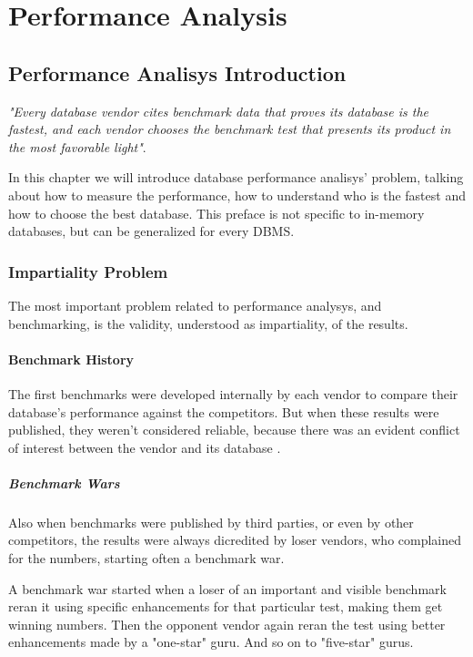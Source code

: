 \part{Performance Analysis}

\chapter{Performance Analisys Introduction}
\emph{"Every database vendor cites benchmark data that proves its database is the fastest, and each vendor chooses the benchmark test that presents its product in the most favorable light"}\cite{burleson}.

In this chapter we will introduce database performance analisys' problem, talking about how to measure the performance, how to understand who is the fastest and how to choose the best database. This preface is not specific to in-memory databases, but can be generalized for every DBMS.
	
	\section{Impartiality Problem}
The most important problem related to performance analysys, and benchmarking, is the validity, understood as impartiality, of the results. 
		
		\subsection{Benchmark History}
The first benchmarks were developed internally by each vendor to compare their database's performance against the competitors. But when these results were published, they weren't considered reliable, because there was an evident conflict of interest between the vendor and its database \cite{gray}.
	
		\subsubsection{Benchmark Wars}
Also when benchmarks were published by third parties, or even by other competitors, the results were always dicredited by loser vendors, who complained for the numbers, starting often a benchmark war. 

A benchmark war started when a loser of an important and visible benchmark reran it using specific enhancements for that particular test, making them get winning numbers. Then the opponent vendor again reran the test using better enhancements made by a "one-star" guru. And so on to "five-star" gurus.

